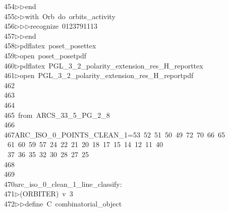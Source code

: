 \begin{tabbing}
454\>$\triangleright$\>$\triangleright$\>end\ \\[0pt]
455\>$\triangleright$\>$\triangleright$\>with\ Orb\ do\ orbits\_activity\ \\[0pt]
456\>$\triangleright$\>$\triangleright$\>$\triangleright$\>recognize\ 0123791113\ \\[0pt]
457\>$\triangleright$\>$\triangleright$\>end\\[0pt]
458\>$\triangleright$\>pdflatex\ poset\_posettex\\[0pt]
459\>$\triangleright$\>open\ poset\_posetpdf\\[0pt]
460\>$\triangleright$\>pdflatex\ PGL\_3\_2\_polarity\_extension\_res\_H\_reporttex\\[0pt]
461\>$\triangleright$\>open\ PGL\_3\_2\_polarity\_extension\_res\_H\_reportpdf\\[0pt]
462\>\\[0pt]
463\>\\[0pt]
464\>\\[0pt]
465\>\ from\ ARCS\_33\_5\_PG\_2\_8\\[0pt]
466\>\\[0pt]
467\>ARC\_ISO\_0\_POINTS\_CLEAN\_1=53\ 52\ 51\ 50\ 49\ 72\ 70\ 66\ 65\\[0pt]
\>\ 61\ 60\ 59\ 57\ 24\ 22\ 21\ 20\ 18\ 17\ 15\ 14\ 12\ 11\ 40\ \\[0pt]
\ 37\ 36\ 35\ 32\ 30\ 28\ 27\ 25\\[0pt]
468\>\\[0pt]
469\>\\[0pt]
470\>arc\_iso\_0\_clean\_1\_line\_classify:\\[0pt]
471\>$\triangleright$\>(ORBITER)\ v\ 3\ \\[0pt]
472\>$\triangleright$\>$\triangleright$\>define\ C\ combinatorial\_object\ \\[0pt]

\end{tabbing}
